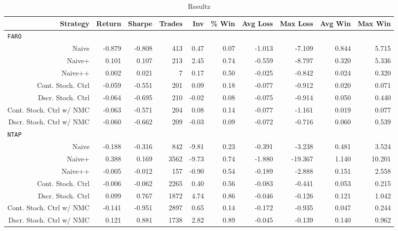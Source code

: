 \begin{sidewaystable}
\centering
{}
\begin{tabular}{@{} *{10}{r} @{}}
\toprule
Strategy & Return & Sharpe & Trades & Inv & \% Win & Avg Loss & Max Loss & Avg Win & Max Win \\
\midrule
\multicolumn{10}{l}{\texttt{FARO}} \\
Naive & -0.879 & -0.808 & 413 & 0.47 & 0.07 & -1.013 & -7.109 & 0.844 & 5.715 \\ 
Naive+ & 0.101 & 0.107 & 213 & 2.45 & 0.74 & -0.559 & -8.797 & 0.320 & 5.336 \\ 
Naive++ & 0.002 & 0.021 & 7 & 0.17 & 0.50 & -0.025 & -0.842 & 0.024 & 0.320 \\ 
Cont. Stoch. Ctrl & -0.059 & -0.551 & 201 & 0.09 & 0.18 & -0.077 & -0.912 & 0.020 & 0.071 \\ 
Dscr. Stoch. Ctrl & -0.064 & -0.695 & 210 & -0.02 & 0.08 & -0.075 & -0.914 & 0.050 & 0.440 \\ 
Cont. Stoch. Ctrl w/ NMC & -0.063 & -0.571 & 204 & 0.08 & 0.14 & -0.077 & -1.161 & 0.019 & 0.077 \\ 
Dscr. Stoch. Ctrl w/ NMC & -0.060 & -0.662 & 209 & -0.03 & 0.09 & -0.072 & -0.716 & 0.060 & 0.539 \\[2ex]
\multicolumn{10}{l}{\texttt{NTAP}} \\
Naive & -0.188 & -0.316 & 842 & -9.81 & 0.23 & -0.391 & -3.238 & 0.481 & 3.524 \\ 
Naive+ & 0.388 & 0.169 & 3562 & -9.73 & 0.74 & -1.880 & -19.367 & 1.140 & 10.201 \\ 
Naive++ & -0.005 & -0.012 & 157 & -0.90 & 0.54 & -0.189 & -2.888 & 0.151 & 2.558 \\ 
Cont. Stoch. Ctrl & -0.006 & -0.062 & 2265 & 0.40 & 0.56 & -0.083 & -0.441 & 0.053 & 0.215 \\ 
Dscr. Stoch. Ctrl & 0.099 & 0.767 & 1872 & 4.74 & 0.86 & -0.046 & -0.126 & 0.121 & 1.042 \\ 
Cont. Stoch. Ctrl w/ NMC & -0.141 & -0.951 & 2897 & 0.65 & 0.14 & -0.172 & -0.935 & 0.047 & 0.244 \\ 
Dscr. Stoch. Ctrl w/ NMC & 0.121 & 0.881 & 1738 & 2.82 & 0.89 & -0.045 & -0.139 & 0.140 & 0.962 \\ 
\bottomrule
\end{tabular}
\caption{Resultz}
\label{tbl:insampleFARONTAP}
\end{sidewaystable}

